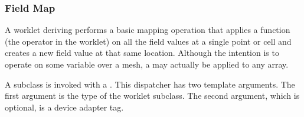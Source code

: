 \newcommand{\commonexecutionsignaturetags}{
\item[\sigtag{WorkIndex}] This tag produces a \vtkm{Id} that uniquely
  identifies the invocation of the worklet.
\item[\sigtag{VisitIndex}] This tag produces a \vtkm{IdComponent} that
  uniquely identifies when multiple worklet invocations operate on the same
  input item, which can happen when defining a worklet with scatter (as
  described in Section~\ref{sec:WorkletScatter}).
}

\subsubsection{Field Map}
\label{sec:WorkletMapField}


A worklet deriving  performs a basic mapping
operation that applies a function (the operator in the worklet) on all the
field values at a single point or cell and creates a new field value at
that same location. Although the intention is to operate on some variable
over a mesh, a  may actually be applied to any
array.

A  subclass is invoked with a
. This dispatcher has two template
arguments. The first argument is the type of the worklet subclass. The
second argument, which is optional, is a device adapter tag.

